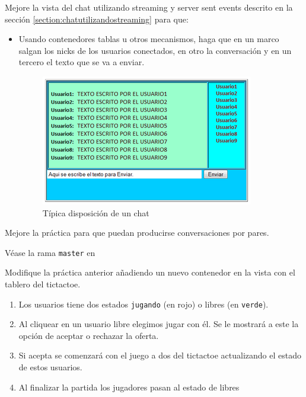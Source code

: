 \label{practica:chat_con_frames}
Mejore la vista del chat utilizando streaming y server sent events descrito en la sección
\ref{section:chatutilizandostreaming} para que:
\begin{itemize}
\item
Usando contenedores
tablas u otros mecanismos, haga que en un marco salgan los nicks de los usuarios conectados,
en otro la conversación y en un tercero el texto que se va a enviar.

\begin{figure}[htb]
\begin{center}
\includegraphics[scale=1]{sinatra/chapter2fundamentos/Chat_web.png}
\end{center}
\label{figure:sinatrachat}
\caption{Típica disposición de un chat}
\end{figure}
\end{itemize}

Mejore la práctica para que puedan producirse conversaciones por pares.

Véase la rama \verb|master| en

Modifique la práctica anterior añadiendo un nuevo contenedor en la vista 
con el tablero del tictactoe.

\begin{enumerate}
\item 
Los usuarios tiene dos estados \verb|jugando| (en rojo)
o libres (en \verb|verde|).

\item 
Al cliquear en un usuario libre elegimos jugar con él. 
Se le mostrará a este la opción de aceptar o rechazar
la oferta. 

\item 
Si acepta se comenzará con el juego a dos del tictactoe
actualizando el estado de estos usuarios.

\item 
Al finalizar la partida los jugadores pasan al estado de libres
\end{enumerate}

